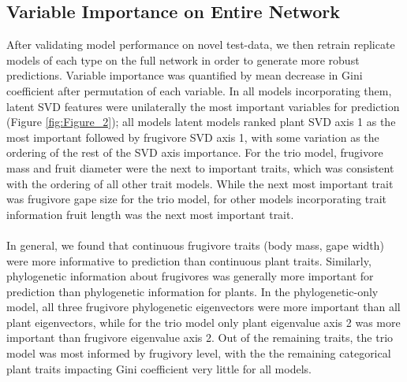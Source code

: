 \documentclass[num-refs]{wiley-article}%
\begin{document}
    
\subsection*{Variable Importance on Entire Network}
After validating model performance on novel test-data, we then retrain replicate models of each type on the full network in order to generate more robust predictions. Variable importance was quantified by mean decrease in Gini coefficient after permutation of each variable. In all models incorporating them, latent SVD features were unilaterally the most important variables for prediction (Figure \ref{fig:Figure_2}); all models latent models ranked plant SVD axis 1 as the most important followed by frugivore SVD axis 1, with some variation as the ordering of the rest of the SVD axis importance. For the trio model, frugivore mass and fruit diameter were the next to important traits, which was consistent with the ordering of all other trait models. While the next most important trait was frugivore gape size for the trio model, for other models incorporating trait information fruit length was the next most important trait. 

\paragraph*{}
In general, we found that continuous frugivore traits (body mass, gape width) were more informative to prediction than continuous plant traits. Similarly, phylogenetic information about frugivores was generally more important for prediction than phylogenetic information for plants. In the phylogenetic-only model, all three frugivore phylogenetic eigenvectors were more important than all plant eigenvectors, while for the trio model only plant eigenvalue axis 2 was more important than frugivore eigenvalue axis 2. Out of the remaining traits, the trio model was most informed by frugivory level, with the the remaining categorical plant traits impacting Gini coefficient very little for all models. 
\end{document}
